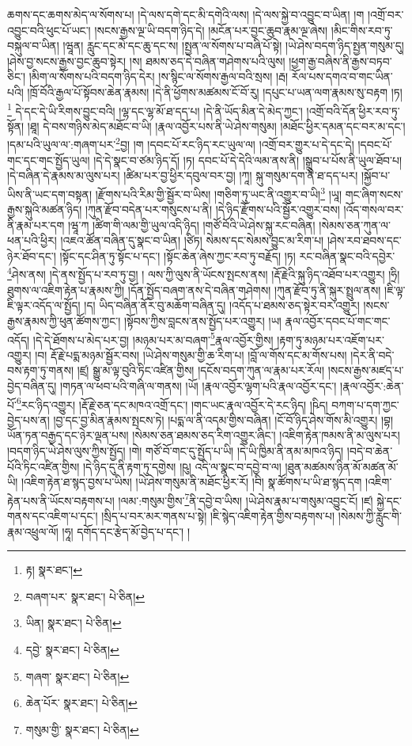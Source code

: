 ཆགས་དང་ཆགས་མེད་ལ་སོགས་པ། །དེ་ལས་དགེ་དང་མི་དགེའི་ལས། །དེ་ལས་སྐྱེ་བ་འབྱུང་བ་ཡིན། །ག །འགྲོ་བར་འབྱུང་བའི་ཕུང་པོ་ཡང་། །སངས་རྒྱས་ལྔ་ཡི་བདག་ཉིད་དེ། །མངོན་པར་བྱང་ཆུབ་རྣམ་ལྔ་ཞེས། །མིང་གིས་རབ་ཏུ་བསྐུལ་བ་ཡིན། །ཝཱན། རླུང་དང་མེ་དང་ཆུ་དང་ས། །སྤྱན་ལ་སོགས་པ་བཞི་པོ་སྟེ། །ཡེ་ཤེས་བདག་ཉིད་སྤྱན་གསུམ་དུ། །ཤེས་བྱ་སངས་རྒྱས་བྱང་ཆུབ་སྟེར། །ས། ཐམས་ཅད་དེ་བཞིན་གཤེགས་པའི་ལུས། །ཕྱག་རྒྱ་བཞིས་ནི་རྒྱས་བཏབ་ཅིང་། །མིག་ལ་སོགས་པའི་བདག་ཉིད་དེར། །ས་སྙིང་ལ་སོགས་རྒྱལ་བའི་སྲས། །རྦ། རོལ་པས་དགའ་བ་གང་ཡིན་པའི། །ཁྲོ་བོའི་རྒྱལ་པོ་སྟོབས་ཆེན་རྣམས། །དེ་ནི་ཕྱོགས་མཚམས་ངོ་བོ་རུ། །དཔུང་པ་ཡན་ལག་རྣམས་སུ་བརྟག །ཏ།\footnote{རྟ།  སྣར་ཐང་། } དེ་དང་དེ་ཡི་རིགས་བྱུང་བའི། །ལྷ་དང་ལྷ་མོ་ཐ་དད་པ། །དེ་ནི་ཡོད་མིན་དེ་མེད་ཀྱང་། །འགྲོ་བའི་དོན་ཕྱིར་རབ་ཏུ་སྟོན། །ཐཱ། དེ་བས་གཉིས་མེད་མཐོང་བ་ཡི། །རྣལ་འབྱོར་པས་ནི་ཡེ་ཤེས་གསུམ། །མཐོང་ཕྱིར་དམན་དང་བར་མ་དང་། །དམ་པའི་ཡུལ་ལ་:གཞག་པར་\footnote{བཞག་པར་  སྣར་ཐང་།  པེ་ཅིན། }བྱ། །ག །དབང་པོ་རང་ཉིད་རང་ཡུལ་ལ། །འགྲོ་བར་གྱུར་པ་དེ་དང་དེ། །དབང་པོ་གང་དང་གང་སྤྱོད་ཡུལ། །དེ་དེ་སྣང་བ་ཙམ་ཉིད་དོ། །ཏ། དབང་པོ་དེ་དེའི་ལམ་ནས་ནི། །སྒྲུབ་པ་པོས་ནི་ཡུལ་ཐོབ་པ། །དེ་བཞིན་དེ་རྣམས་མ་ལུས་པར། །ཚིམ་པར་བྱ་ཕྱིར་དབུལ་བར་བྱ། །ཀཱ། སྐུ་གསུམ་དག་ནི་ཐ་དད་པར། །སྐྱོབ་པ་ཡིས་ནི་ཡང་དག་བསྟན། །རྫོགས་པའི་རིམ་གྱི་སྦྱོར་བ་ཡིས། །གཅིག་ཏུ་ཡང་ནི་འགྱུར་བ་ཡི།\footnote{ཡིན།  སྣར་ཐང་།  པེ་ཅིན། } །ཡཱ། གང་ཞིག་སངས་རྒྱས་སྐུའི་མཚན་ཉིད། །ཀུན་རྫོབ་བདེན་པར་གསུངས་པ་ནི། །དེ་ཉིད་རྫོགས་པའི་སྦྱོར་འགྱུར་བས། །འོད་གསལ་བར་ནི་རྣམ་པར་དག །ཝཱ་ཀ །ཚིག་གི་ལམ་གྱི་ཡུལ་འདི་ཉིད། །གཙོ་བོའི་ཡེ་ཤེས་སྐུ་རང་བཞིན། །སེམས་ཅན་ཀུན་ལ་ཕན་པའི་ཕྱིར། །འཇའ་ཚོན་བཞིན་དུ་སྣང་བ་ཡིན། །ཙིཏ། སེམས་དང་སེམས་བྱུང་མ་རིག་པ། །ཤེས་རབ་ཐབས་དང་ཉེར་ཐོབ་དང་། །སྟོང་དང་ཤིན་ཏུ་སྟོང་པ་དང་། །སྟོང་ཆེན་ཞེས་ཀྱང་རབ་ཏུ་བརྗོད། །ཏ། རང་བཞིན་སྣང་བའི་དབྱེར་\footnote{དབྱེ་  སྣར་ཐང་།  པེ་ཅིན། }ཤེས་ནས། །དེ་ནས་སྤྱོད་པ་རབ་ཏུ་བྱ། །
ལས་ཀྱི་ལུས་ནི་ཡོངས་སྤངས་ནས། །རྡོ་རྗེའི་སྐུ་ཉིད་འཐོབ་པར་འགྱུར། །ཧྲི། ཐུགས་ལ་འཇིག་རྟེན་པ་རྣམས་ཀྱི། །དོན་སྤྱོད་བཞག་ནས་དེ་བཞིན་གཤེགས། །ཀུན་རྫོབ་ཏུ་ནི་སྐུར་སྤྲུལ་ནས། །ཇི་ལྟ་ཇི་ལྟར་འདོད་ལ་སྤྱོད། །ད། ཡིད་བཞིན་ནོར་བུ་མཆོག་བཞིན་དུ། །འདོད་པ་ཐམས་ཅད་སྟེར་བར་འགྱུར། །སངས་རྒྱས་རྣམས་ཀྱི་ཕུན་ཚོགས་ཀྱང་། །སྟོབས་ཀྱིས་བླངས་ནས་སྤྱོད་པར་འགྱུར། །ཡ། རྣལ་འབྱོར་དབང་པོ་གང་གང་འདོད། །དེ་དེ་ཐོགས་པ་མེད་པར་བྱ། །མཉམ་པར་མ་བཞག་\footnote{གཞག་  སྣར་ཐང་།  པེ་ཅིན། }རྣལ་འབྱོར་གྱིས། །རྟག་ཏུ་མཉམ་པར་འཇོག་པར་འགྱུར། །བ། རྡོ་རྗེ་པདྨ་མཉམ་སྦྱོར་བས། །ཡེ་ཤེས་གསུམ་གྱི་ཆ་རིག་པ། །བློ་ལ་གོས་དང་མ་གོས་པས། །དེར་ནི་བདེ་བས་རྟག་ཏུ་གནས། །ཛྲ། སྒྱུ་མ་ལྟ་བུའི་ཏིང་འཛིན་གྱིས། །དངོས་བདག་ཀུན་ལ་རྣམ་པར་རོལ། །སངས་རྒྱས་མཛད་པ་བྱེད་བཞིན་དུ། །གཏན་ལ་ཕབ་པའི་གཞི་ལ་གནས། །ཡོ། །རྣལ་འབྱོར་ལྷག་པའི་རྣལ་འབྱོར་དང་། །རྣལ་འབྱོར་:ཆེན་པོ་\footnote{ཆེན་པོར་  སྣར་ཐང་།  པེ་ཅིན། }རང་ཉིད་འགྱུར། །རྡོ་རྗེ་ཅན་དང་མཁའ་འགྲོ་དང་། །གང་ཡང་རྣལ་འབྱོར་དེ་རང་ཉིད། །ཥིད། བཀག་པ་དག་ཀྱང་བྱེད་པས་ན། །བྱ་དང་བྱ་མིན་རྣམས་སྤངས་ཏེ། །པདྨ་ལ་ནི་འདམ་གྱིས་བཞིན། །ངོ་བོ་ཉིད་ཤེས་གོས་མི་འགྱུར། །བྷ། ཡོན་ཏན་བརྒྱད་དང་ཉེར་ལྡན་པས། །སེམས་ཅན་ཐམས་ཅད་རིག་འགྱུར་ཞིང་། །འཇིག་རྟེན་ཁམས་ནི་མ་ལུས་པར། །བདག་ཉིད་ཡེ་ཤེས་ལུས་ཀྱིས་སྤྱོད། །གེ། གཙོ་བོ་གང་དུ་སྤྱོད་པ་ཡི། །དེ་ཡི་ཁྱིམ་ནི་ནམ་མཁའ་ཉིད། །བདེ་བ་ཆེན་པོའི་ཏིང་འཛིན་གྱིས། །དེ་ཉིད་དུ་ནི་རྟག་ཏུ་དགྱེས། །ཥུ། འདི་ལ་སྣང་བ་དབྱེ་བ་ལ། །ཐུན་མཚམས་ཉིན་མོ་མཚན་མོ་ཡི། །འཇིག་རྟེན་ཐ་སྙད་བྱས་པ་ཡིས། །ཡེ་ཤེས་གསུམ་ནི་མཐོང་ཕྱིར་རོ། །བི། སྣ་ཚོགས་པ་ཡི་ཐ་སྙད་དག །འཇིག་རྟེན་པས་ནི་ཡོངས་བརྟགས་པ། །ལམ་:གསུམ་གྱིས་\footnote{གསུམ་གྱི་  སྣར་ཐང་།  པེ་ཅིན། }ནི་དབྱེ་བ་ཡིས། །ཡེ་ཤེས་རྣམ་པ་གསུམ་འབྱུང་ངོ། །ཛ། སྐྱེ་དང་གནས་དང་འཇིག་པ་དང་། །སྲིད་པ་བར་མར་གནས་པ་སྟེ། །ཇི་སྙེད་འཇིག་རྟེན་གྱིས་བརྟགས་པ། །སེམས་ཀྱི་རླུང་གི་རྣམ་འཕྲུལ་ལོ། །ཧཱ། དགོད་དང་རྩེད་མོ་བྱེད་པ་དང་། །
